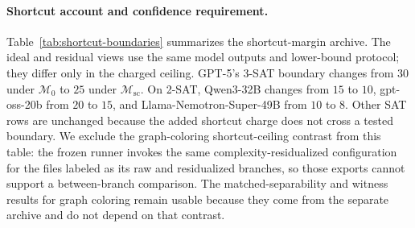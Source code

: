 \documentclass[acmsmall,screen,review,anonymous]{acmart}
\providecommand{\MarginZero}{\mathcal{M}_{0}}
\providecommand{\MarginShortcut}{\mathcal{M}_{\mathrm{sc}}}
\begin{document}
\begin{table}[t]
\centering
\caption{Matched-separability prefix boundaries under alternative reporting
thresholds. Boundaries are comparable only within the same task family.}
\label{tab:matched-threshold-boundaries}
\renewcommand{\arraystretch}{1.08}
\end{table}

\paragraph{Shortcut account and confidence requirement.}
Table~\ref{tab:shortcut-boundaries} summarizes the shortcut-margin archive. The
ideal and residual views use the same model outputs and lower-bound protocol;
they differ only in the charged ceiling. GPT-5's 3-SAT boundary changes from
\(30\) under \(\MarginZero\) to \(25\) under \(\MarginShortcut\). On 2-SAT,
Qwen3-32B changes from \(15\) to \(10\), gpt-oss-20b from \(20\) to \(15\),
and Llama-Nemotron-Super-49B from \(10\) to \(8\). Other SAT rows are
unchanged because the added shortcut charge does not cross a tested boundary.
We exclude the graph-coloring shortcut-ceiling contrast from this table: the
frozen runner invokes the same complexity-residualized configuration for the
files labeled as its raw and residualized branches, so those exports cannot
support a between-branch comparison. The matched-separability and witness
results for graph coloring remain usable because they come from the separate
archive and do not depend on that contrast.
\end{document}
